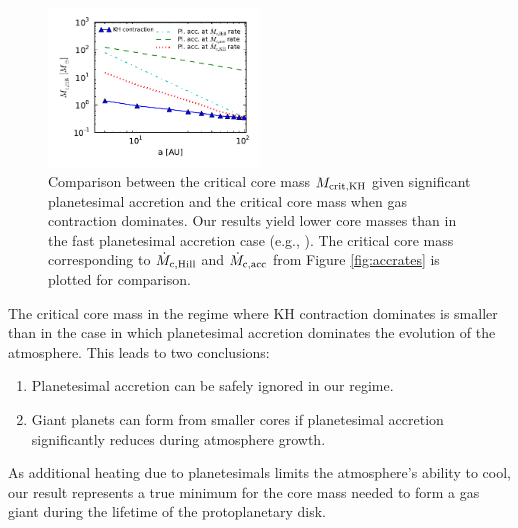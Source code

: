 \documentclass[apj]{emulateapj}
\begin{document}
 \begin{figure}[h]
\centering
\includegraphics[width=0.5\textwidth]{../../figs/ModelAtmospheres/RadSelfGravRealEOS/PaperFigs/Mc_vs_a_poly_comp.pdf}
\caption{Comparison between the critical core mass $M_{\rm{crit, KH}}$ given significant planetesimal accretion and the critical core mass when gas contraction dominates. Our results yield lower core masses than in the fast planetesimal accretion case (e.g., \citealt{rafikov06}). The critical core mass corresponding to $\dot{M}_{\rm c, Hill}$ and $\dot{M}_{\rm c, acc}$ from Figure \ref{fig:accrates} is plotted for comparison.}
\label{fig:raf2}
\end{figure}

The critical core mass in the regime where KH contraction dominates is smaller than in the case in which planetesimal accretion dominates the evolution of the atmosphere. This leads to two conclusions:

\begin{enumerate}
\item Planetesimal accretion can be safely ignored in our regime.
\item Giant planets can form from smaller cores if planetesimal accretion significantly reduces during atmosphere growth. 
\end{enumerate}

As additional heating due to planetesimals limits the atmosphere's ability to cool, our result represents a true minimum for the core mass needed to form a gas giant during the lifetime of the protoplanetary disk.


\end{document}
